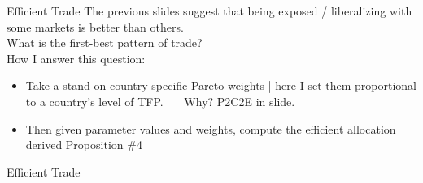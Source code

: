 \documentclass[9pt,pdftex,aspectratio=1610]{beamer}
\theoremstyle{definition}
\begin{document}
\begin{frame}[t]{Efficient Trade}
\smallskip
The previous slides suggest that being exposed / liberalizing with some markets is better than others.\\
\bigskip
What is the first-best pattern of trade?\\
\bigskip
How I answer this question:
\begin{itemize}
\smallskip
\item Take a stand on country-specific Pareto weights | here I set them proportional to a country's level of TFP. \ \ \ Why? P2C2E in slide.
\smallskip
\item Then given parameter values and weights, compute the efficient allocation derived Proposition \#4 
\end{itemize}
\end{frame}


\begin{frame}[t]{Efficient Trade}

\begin{figure}[!t]
\end{figure}

\end{frame}
\end{document}
